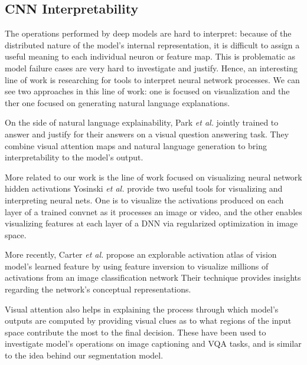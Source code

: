 \documentclass[10pt,twocolumn,letterpaper]{article}
\begin{document}
\subsection{CNN Interpretability}
The operations performed by deep models are hard to interpret:
because of the distributed nature of the model's internal representation,
it is difficult to assign a useful meaning to each individual neuron or feature map.
This is problematic as model failure cases are very hard to investigate and justify.
Hence, an interesting line of work is researching for tools to interpret neural network processes.
We can see two approaches in this line of work:
one is focused on visualization and the ther one focused on generating natural language explanations.
 
On the side of natural language explainability, Park \textit{et al.} \cite{park2016attentive} jointly trained to answer and justify for their
answers on a visual question answering task. 
They combine visual attention maps and natural language generation to bring interpretability to the model's output.
 
More related to our work is the line of work focused on visualizing neural network hidden activations
Yosinski \textit{et al.} \cite{yosinski2015understanding} provide two useful tools for visualizing and interpreting neural nets. 
One is to visualize  the activations produced on each layer of a trained convnet as it 
processes an image or video, and the other enables visualizing 
features at each layer of a DNN via regularized optimization in image space.

More recently, Carter \textit{et al.} \cite{xxx} propose an explorable activation atlas of vision model's learned feature by using feature inversion to visualize millions of activations from an image classification network
Their technique provides insights regarding the network's conceptual representations.

Visual attention \cite{xxx} also helps in explaining the process through which model's 
outputs are computed by providing visual clues as to what regions of the input space 
contribute the most to the final decision. 
These have been used to investigate model's operations on image captioning \cite{xxx} and VQA \cite{xxx} tasks,
and is similar to the idea behind our segmentation model.
\end{document}
